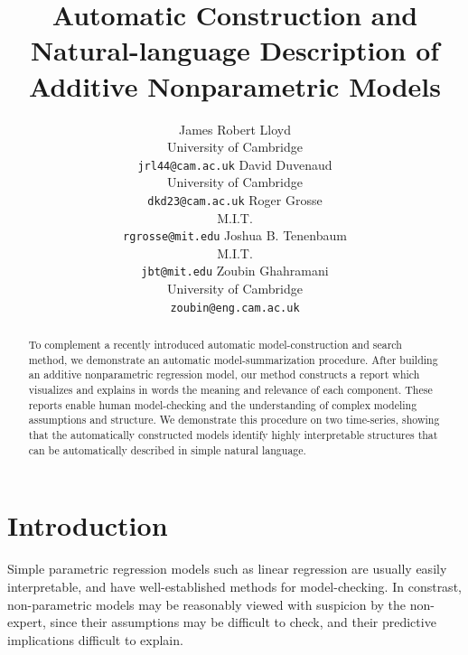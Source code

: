 \documentclass{article} %
\title{Automatic Construction and Natural-language Description of Additive Nonparametric Models}
\author{
James Robert Lloyd\\
University of Cambridge\\
\texttt{jrl44@cam.ac.uk}
\And
David Duvenaud\\
University of Cambridge \\
\texttt{dkd23@cam.ac.uk}
\And
Roger Grosse\\
M.I.T.\\
\texttt{rgrosse@mit.edu}
\And
Joshua B. Tenenbaum\\
M.I.T.\\
\texttt{jbt@mit.edu}
\And
Zoubin Ghahramani\\
University of Cambridge \\
\texttt{zoubin@eng.cam.ac.uk}
}
\begin{document}
\allowdisplaybreaks

\maketitle

\begin{abstract}
To complement a recently introduced automatic model-construction and search method, we demonstrate an automatic model-summarization procedure.
After building an additive nonparametric regression model, our method constructs a report which visualizes and explains in words the meaning and relevance of each component.
These reports enable human model-checking and the understanding of complex modeling assumptions and structure.
We demonstrate this procedure on two time-series, showing that the automatically constructed models identify highly interpretable structures that can be automatically described in simple natural language.
\end{abstract}

\section{Introduction}
\vspace{-0.08in}


Simple parametric regression models such as linear regression are usually easily interpretable, and have well-established methods for model-checking.
In constrast, non-parametric models may be reasonably viewed with suspicion by the non-expert, since their assumptions may be difficult to check, and their predictive implications difficult to explain.

\end{document}
